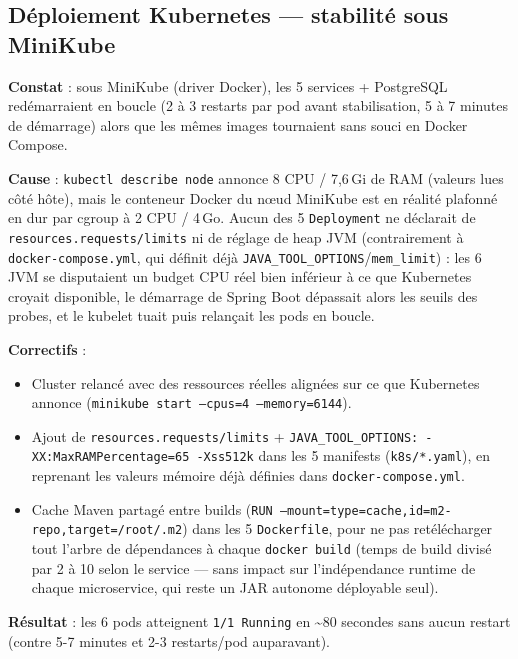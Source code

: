 \documentclass[a4paper,11pt]{article}
\begin{document}
\subsection{D\'eploiement Kubernetes --- stabilit\'e sous MiniKube}

\textbf{Constat} : sous MiniKube (driver Docker), les 5 services + PostgreSQL red\'emarraient en boucle (2 \`a 3 restarts par pod avant stabilisation, 5 \`a 7 minutes de d\'emarrage) alors que les m\^emes images tournaient sans souci en Docker Compose.

\textbf{Cause} : \texttt{kubectl describe node} annonce 8 CPU / 7,6\,Gi de RAM (valeurs lues c\^ot\'e h\^ote), mais le conteneur Docker du n\oe{}ud MiniKube est en r\'ealit\'e plafonn\'e en dur par cgroup \`a 2 CPU / 4\,Go. Aucun des 5 \texttt{Deployment} ne d\'eclarait de \texttt{resources.requests/limits} ni de r\'eglage de heap JVM (contrairement \`a \texttt{docker-compose.yml}, qui d\'efinit d\'ej\`a \texttt{JAVA\_TOOL\_OPTIONS}/\texttt{mem\_limit}) : les 6 JVM se disputaient un budget CPU r\'eel bien inf\'erieur \`a ce que Kubernetes croyait disponible, le d\'emarrage de Spring Boot d\'epassait alors les seuils des probes, et le kubelet tuait puis relan\c{c}ait les pods en boucle.

\textbf{Correctifs} :
\begin{itemize}[nosep]
  \item Cluster relanc\'e avec des ressources r\'eelles align\'ees sur ce que Kubernetes annonce (\texttt{minikube start --cpus=4 --memory=6144}).
  \item Ajout de \texttt{resources.requests/limits} + \texttt{JAVA\_TOOL\_OPTIONS: -XX:MaxRAMPercentage=65 -Xss512k} dans les 5 manifests (\texttt{k8s/*.yaml}), en reprenant les valeurs m\'emoire d\'ej\`a d\'efinies dans \texttt{docker-compose.yml}.
  \item Cache Maven partag\'e entre builds (\texttt{RUN --mount=type=cache,id=m2-repo,target=/root/.m2}) dans les 5 \texttt{Dockerfile}, pour ne pas ret\'el\'echarger tout l'arbre de d\'ependances \`a chaque \texttt{docker build} (temps de build divis\'e par 2 \`a 10 selon le service --- sans impact sur l'ind\'ependance runtime de chaque microservice, qui reste un JAR autonome d\'eployable seul).
\end{itemize}

\textbf{R\'esultat} : les 6 pods atteignent \texttt{1/1 Running} en \textasciitilde{}80 secondes sans aucun restart (contre 5-7 minutes et 2-3 restarts/pod auparavant).
\end{document}
